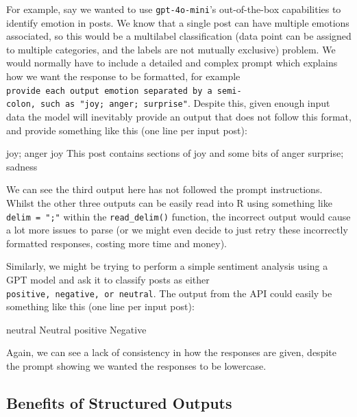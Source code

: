 \documentclass[
  letterpaper,
  DIV=11,
  numbers=noendperiod]{scrreprt}
\newenvironment{Shaded}{\begin{snugshade}}{\end{snugshade}}
\newcommand{\NormalTok}[1]{\textcolor[rgb]{0.00,0.23,0.31}{#1}}
\begin{document}
For example, say we wanted to use \texttt{gpt-4o-mini}'s out-of-the-box
capabilities to identify emotion in posts. We know that a single post
can have multiple emotions associated, so this would be a multilabel
classification (data point can be assigned to multiple categories, and
the labels are not mutually exclusive) problem. We would normally have
to include a detailed and complex prompt which explains how we want the
response to be formatted, for example
\texttt{provide\ each\ output\ emotion\ separated\ by\ a\ semi-colon,\ such\ as\ "joy;\ anger;\ surprise"}.
Despite this, given enough input data the model will inevitably provide
an output that does not follow this format, and provide something like
this (one line per input post):

\begin{Shaded}
\begin{Highlighting}[]
\NormalTok{joy; anger}
\NormalTok{joy}
\NormalTok{This post contains sections of joy and some bits of anger}
\NormalTok{surprise; sadness}
\end{Highlighting}
\end{Shaded}

We can see the third output here has not followed the prompt
instructions. Whilst the other three outputs can be easily read into R
using something like \texttt{delim\ =\ ";"} within the
\texttt{read\_delim()} function, the incorrect output would cause a lot
more issues to parse (or we might even decide to just retry these
incorrectly formatted responses, costing more time and money).

Similarly, we might be trying to perform a simple sentiment analysis
using a GPT model and ask it to classify posts as either
\texttt{positive,\ negative,\ or\ neutral}. The output from the API
could easily be something like this (one line per input post):

\begin{Shaded}
\begin{Highlighting}[]
\NormalTok{neutral}
\NormalTok{Neutral}
\NormalTok{positive}
\NormalTok{Negative}
\end{Highlighting}
\end{Shaded}

Again, we can see a lack of consistency in how the responses are given,
despite the prompt showing we wanted the responses to be lowercase.

\subsection{Benefits of Structured
Outputs}\label{benefits-of-structured-outputs}
\end{document}
